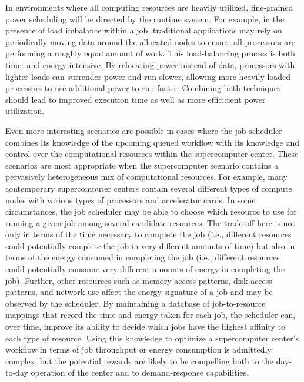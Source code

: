In environments where all computing resources are heavily utilized,
fine-grained power scheduling will be directed by the runtime system.
For example, in the presence of load imbalance within a job, traditional
applications may rely on periodically moving data around the allocated
nodes to ensure all processors are performing a roughly equal amount
of work.  This load-balancing process is both time- and energy-intensive.
By relocating power instead of data, processors with lighter loads can
surrender power and run slower, allowing more heavily-loaded processors
to use additional power to run faster.  Combining both techniques 
should lead to improved execution time as well as more efficicient
power utilization.

Even more interesting scenarios are possible in cases where the job
scheduler combines its knowledge of the upcoming queued workflow with
its knowledge and control over the computational resources within the
supercomputer center.  These scenarios are most appropriate when the
supercomputer scenario contains a pervasively heterogeneous mix of
computational resources.  For example, many contemporary supercomputer
centers contain several different types of compute nodes with various
types of processors and accelerator cards.  In some circumstances, the
job scheduler may be able to choose which resource to use for running
a given job among several candidate resources.  The trade-off here is
not only in terms of the time necessary to complete the job (i.e.,
different resources could potentially complete the job in very
different amounts of time) but also in terms of the energy consumed in
completing the job (i.e., different resources could potentially
consume very different amounts of energy in completing the job).
Further, other resources such as memory access patterns, disk access
patterns, and network use affect the energy signature of a job and may
be observed by the scheduler.  By maintaining a database of
job-to-resource mappings that record the time and energy taken for
each job, the scheduler can, over time, improve its ability to decide
which jobs have the highest affinity to each type of resource.  Using
this knowledge to optimize a supercomputer center's workflow in terms
of job throughput or energy consumption is admittedly complex, but the
potential rewards are likely to be compelling both to the day-to-day
operation of the center and to demand-response capabilities.

